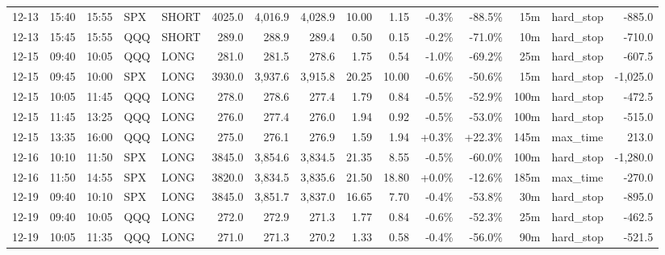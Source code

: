 \documentclass[11pt,a4paper,twoside]{article}
\begin{document}
\begin{landscape}
\begin{center}
\begin{longtable}{>{\color{txtmain}}l l l l l r r r r r r r r >{\color{txtmain}}l r}
12-13 & 15:40 & 15:55 & SPX & SHORT & 4025.0 & 4,016.9 & 4,028.9 & 10.00 & 1.15 & \textcolor{lossred}{-0.3\%} & \textcolor{lossred}{-88.5\%} & 15m & hard\_stop & \textcolor{lossred}{-885.0} \\
12-13 & 15:45 & 15:55 & QQQ & SHORT & 289.0 & 288.9 & 289.4 & 0.50 & 0.15 & \textcolor{lossred}{-0.2\%} & \textcolor{lossred}{-71.0\%} & 10m & hard\_stop & \textcolor{lossred}{-710.0} \\
12-15 & 09:40 & 10:05 & QQQ & LONG & 281.0 & 281.5 & 278.6 & 1.75 & 0.54 & \textcolor{lossred}{-1.0\%} & \textcolor{lossred}{-69.2\%} & 25m & hard\_stop & \textcolor{lossred}{-607.5} \\
12-15 & 09:45 & 10:00 & SPX & LONG & 3930.0 & 3,937.6 & 3,915.8 & 20.25 & 10.00 & \textcolor{lossred}{-0.6\%} & \textcolor{lossred}{-50.6\%} & 15m & hard\_stop & \textcolor{lossred}{-1,025.0} \\
12-15 & 10:05 & 11:45 & QQQ & LONG & 278.0 & 278.6 & 277.4 & 1.79 & 0.84 & \textcolor{lossred}{-0.5\%} & \textcolor{lossred}{-52.9\%} & 100m & hard\_stop & \textcolor{lossred}{-472.5} \\
12-15 & 11:45 & 13:25 & QQQ & LONG & 276.0 & 277.4 & 276.0 & 1.94 & 0.92 & \textcolor{lossred}{-0.5\%} & \textcolor{lossred}{-53.0\%} & 100m & hard\_stop & \textcolor{lossred}{-515.0} \\
12-15 & 13:35 & 16:00 & QQQ & LONG & 275.0 & 276.1 & 276.9 & 1.59 & 1.94 & \textcolor{wingreen}{+0.3\%} & \textcolor{wingreen}{+22.3\%} & 145m & max\_time & \textcolor{wingreen}{213.0} \\
12-16 & 10:10 & 11:50 & SPX & LONG & 3845.0 & 3,854.6 & 3,834.5 & 21.35 & 8.55 & \textcolor{lossred}{-0.5\%} & \textcolor{lossred}{-60.0\%} & 100m & hard\_stop & \textcolor{lossred}{-1,280.0} \\
12-16 & 11:50 & 14:55 & SPX & LONG & 3820.0 & 3,834.5 & 3,835.6 & 21.50 & 18.80 & \textcolor{wingreen}{+0.0\%} & \textcolor{lossred}{-12.6\%} & 185m & max\_time & \textcolor{lossred}{-270.0} \\
12-19 & 09:40 & 10:10 & SPX & LONG & 3845.0 & 3,851.7 & 3,837.0 & 16.65 & 7.70 & \textcolor{lossred}{-0.4\%} & \textcolor{lossred}{-53.8\%} & 30m & hard\_stop & \textcolor{lossred}{-895.0} \\
12-19 & 09:40 & 10:05 & QQQ & LONG & 272.0 & 272.9 & 271.3 & 1.77 & 0.84 & \textcolor{lossred}{-0.6\%} & \textcolor{lossred}{-52.3\%} & 25m & hard\_stop & \textcolor{lossred}{-462.5} \\
12-19 & 10:05 & 11:35 & QQQ & LONG & 271.0 & 271.3 & 270.2 & 1.33 & 0.58 & \textcolor{lossred}{-0.4\%} & \textcolor{lossred}{-56.0\%} & 90m & hard\_stop & \textcolor{lossred}{-521.5} \\

\end{longtable}
\end{center}
\end{landscape}
\end{document}

